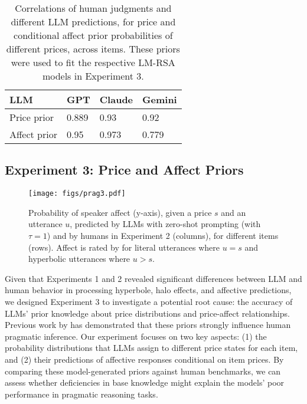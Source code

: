 \begin{table}[ht!]
\centering
\begin{tabular}{llll}
\toprule
 \textbf{LLM} & GPT & Claude & Gemini  \\ \midrule
 Price prior  & 0.889 & 0.93 &  0.92  \\ 
 Affect prior & 0.95 & 0.973 & 0.779 \\
 \bottomrule
\end{tabular}
\caption{Correlations of human judgments and different LLM predictions, for price and conditional affect prior probabilities of different prices, across items.
These priors were used to fit the respective LM-RSA models in Experiment 3. \label{tab:priors}}
\end{table}

\subsection{Experiment 3: Price and Affect Priors}

\begin{figure*}[tbp]
    \centering
    \texttt{[image: figs/prag3.pdf]} 
    \caption{Probability of speaker affect (y-axis), given a price $s$ and an utterance $u$, predicted by LLMs with zero-shot prompting (with $\tau=1$) and by humans in Experiment 2 (columns), for different items (rows). Affect is rated by for literal utterances where $u=s$ and hyperbolic utterances where $u > s$. 
    }
    \label{fig:expt2}
\end{figure*}
Given that Experiments 1 and 2 revealed significant differences between LLM and human behavior in processing hyperbole, halo effects, and affective predictions, we designed Experiment 3 to investigate a potential root cause: the accuracy of LLMs' prior knowledge about price distributions and price-affect relationships. Previous work by \citet{kao2014nonliteral} has demonstrated that these priors strongly influence human pragmatic inference. Our experiment focuses on two key aspects: (1) the probability distributions that LLMs assign to different price states for each item, and (2) their predictions of affective responses conditional on item prices. By comparing these model-generated priors against human benchmarks, we can assess whether deficiencies in base knowledge might explain the models' poor performance in pragmatic reasoning tasks. 

